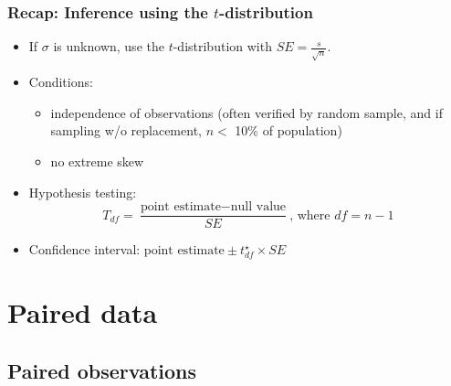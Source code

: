 \documentclass[notes,11pt, aspectratio=169]{beamer}
\begin{document}

\begin{frame}
\frametitle{Recap: Inference using the $t$-distribution}

\begin{itemize}

\item If $\sigma$ is unknown, use the $t$-distribution with $SE = \frac{s}{\sqrt{n}}$.

\pause

\item Conditions: 
\begin{itemize}
\item independence of observations (often verified by random sample, and if sampling w/o replacement, $n < $ 10\% of population)
\item no extreme skew
\end{itemize}

\pause

\item Hypothesis testing: 
\[ T_{df} = \frac{\text{point estimate} - \text{null value}}{SE}\text{, where }df = n - 1 \]

\pause

\item Confidence interval: $\text{point estimate} \pm t_{df}^\star \times SE$

\end{itemize}

\pause

\vspace{-0.25cm}


\end{frame}


\section{Paired data}


\subsection{Paired observations}
\end{document}
